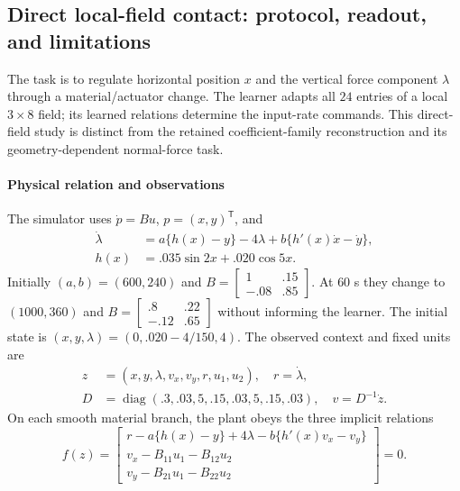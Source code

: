 \subsection{Direct local-field contact: protocol, readout, and limitations}
\label{sec:direct_contact_protocol}
The task is to regulate horizontal position $x$ and the vertical force
component $\lambda$ through a material/actuator change. The learner adapts all
$24$ entries of a local $3\times8$ field; its learned relations determine the
input-rate commands. This direct-field study is distinct from the retained
coefficient-family reconstruction and its geometry-dependent normal-force task.

\paragraph{Physical relation and observations}
The simulator uses $\dot p=Bu$, $p=(x,y)^{\mathsf T}$, and
\begin{align}
 \dot\lambda&=a\{h(x)-y\}-4\lambda+b\{h'(x)\dot x-\dot y\},\nonumber\\
 h(x)&=.035\sin2x+.020\cos5x.
 \label{eq:direct_contact_plant}
\end{align}
Initially $(a,b)=(600,240)$ and
$B=\left[\begin{smallmatrix}1&.15\\-.08&.85\end{smallmatrix}\right]$.
At $60$ s they change to $(1000,360)$ and
$B=\left[\begin{smallmatrix}.8&.22\\-.12&.65\end{smallmatrix}\right]$
without informing the learner. The initial state is
$(x,y,\lambda)=(0,.020-4/150,4)$.
The observed context and fixed units are
\begin{align}
 z&=(x,y,\lambda,v_x,v_y,r,u_1,u_2),\quad r=\dot\lambda,\nonumber\\
 D&=\operatorname{diag}(.3,.03,5,.15,.03,5,.15,.03),\quad
 v=D^{-1}\dot z.\label{eq:direct_contact_units}
\end{align}
On each smooth material branch, the plant obeys the three implicit relations
\begin{equation}
 f(z)=\begin{bmatrix}
 r-a\{h(x)-y\}+4\lambda-b\{h'(x)v_x-v_y\}\\
 v_x-B_{11}u_1-B_{12}u_2\\
 v_y-B_{21}u_1-B_{22}u_2
 \end{bmatrix}=0.
 \label{eq:direct_contact_relation}
\end{equation}
